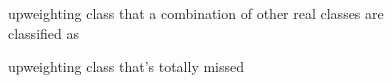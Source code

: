 \begin{figure}
	\begin{center}
		\caption{upweighting class that a combination of other real classes are classified as}
		\label{fig:systematic_subsumee}
	\end{center}
\end{figure}

\begin{figure}
	\begin{center}
		\caption{upweighting class that's totally missed}
		\label{fig:systematic_invisible}
	\end{center}
\end{figure}
